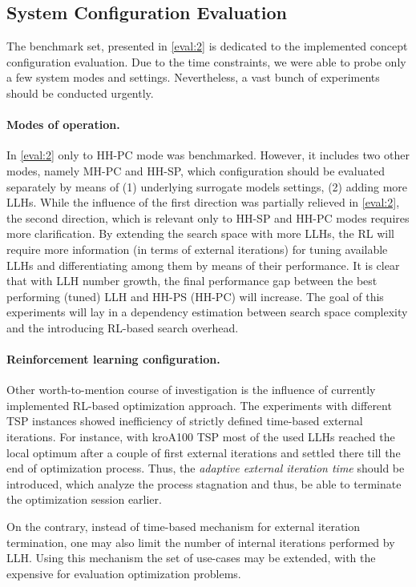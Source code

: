\subsection{System Configuration Evaluation}
The benchmark set, presented in \cref{eval:2} is dedicated to the implemented concept configuration evaluation. Due to the time constraints, we were able to probe only a few system modes and settings. Nevertheless, a vast bunch of experiments should be conducted urgently.

\paragraph{Modes of operation.} In \cref{eval:2} only to HH-PC mode was benchmarked. However, it includes two other modes, namely MH-PC and HH-SP, which configuration should be evaluated separately by means of (1) underlying surrogate models settings, (2) adding more LLHs. While the influence of the first direction was partially relieved in \cref{eval:2}, the second direction, which is relevant only to HH-SP and HH-PC modes requires more clarification. By extending the search space with more LLHs, the RL will require more information (in terms of external iterations) for tuning available LLHs and differentiating among them by means of their performance. It is clear that with LLH number growth, the final performance gap between the best performing (tuned) LLH and HH-PS (HH-PC) will increase. The goal of this experiments will lay in a dependency estimation between search space complexity and the introducing RL-based search overhead.

\paragraph{Reinforcement learning configuration.} Other worth-to-mention course of investigation is the influence of currently implemented RL-based optimization approach. The experiments with different TSP instances showed inefficiency of strictly defined time-based external iterations. For instance, with kroA100 TSP most of the used LLHs reached the local optimum after a couple of first external iterations and settled there till the end of optimization process. Thus, the \emph{adaptive external iteration time} should be introduced, which analyze the process stagnation and thus, be able to terminate the optimization session earlier. 

On the contrary, instead of time-based mechanism for external iteration termination, one may also limit the number of internal iterations performed by LLH. Using this mechanism the set of use-cases may be extended, with the expensive for evaluation optimization problems.